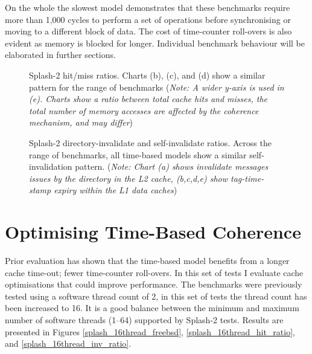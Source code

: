 		On the whole the slowest model demonstrates that these benchmarks require more than 1,000 cycles to perform a set of operations before synchronising or moving to a different block of data. The cost of time-counter roll-overs is also evident as memory is blocked for longer. Individual benchmark behaviour will be elaborated in further sections.

		\clearpage
		\begin{figure}[!h]
		\centering 
			\caption[Splash-2 hit/miss ratios]{Splash-2 hit/miss ratios. Charts (b), (c), and (d) show a similar pattern for the range of benchmarks (\textit{Note: A wider y-axis is used in (e). Charts show a ratio between total cache hits and misses, the total number of memory accesses are affected by the coherence mechanism, and may differ})} 
			\label{splash_combined_ratio}
		\end{figure}
		
		\begin{figure}[!h]
		\centering 
			\caption[Splash-2 directory-invalidate and self-invalidate ratios]{Splash-2 directory-invalidate and self-invalidate ratios. Across the range of benchmarks, all time-based models show a similar self-invalidation pattern. (\textit{Note: Chart (a) shows invalidate messages issues by the directory in the L2 cache, (b,c,d,e) show tag-time-stamp expiry within the L1 data caches})} 
			\label{splash_combined_inv_ratio}
		\end{figure}
	
\clearpage
	\section{Optimising Time-Based Coherence}
		Prior evaluation has shown that the time-based model benefits from a longer cache time-out; fewer time-counter roll-overs. In this set of tests I evaluate cache optimisations that could improve performance.
		The benchmarks were previously tested using a software thread count of 2, in this set of tests the thread count has been increased to 16. It is a good balance between the minimum and maximum number of software threads (1--64) supported by Splash-2 tests. Results are presented in Figures \ref{splash_16thread_freebsd}, \ref{splash_16thread_hit_ratio}, and \ref{splash_16thread_inv_ratio}.
		
